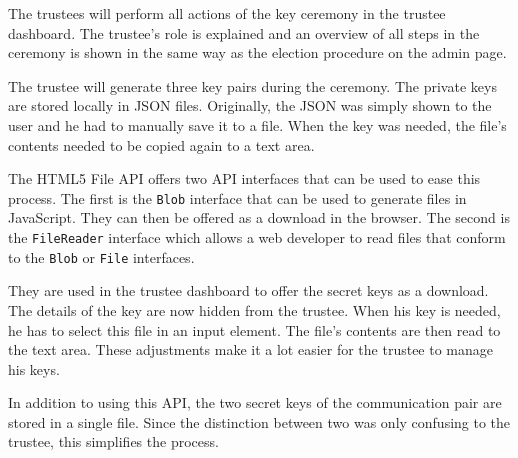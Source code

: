 The trustees will perform all actions of the key ceremony in the trustee dashboard. The trustee's role is explained and an overview of all steps in the ceremony is shown in the same way as the election procedure on the admin page.

\par The trustee will generate three key pairs during the ceremony. The private keys are stored locally in JSON files. Originally, the JSON was simply shown to the user and he had to manually save it to a file. When the key was needed, the file's contents needed to be copied again to a text area.

\par The HTML5 File API offers two API interfaces that can be used to ease this process.\cite{ranganathan_sicking_file_api} The first is the \texttt{Blob} interface that can be used to generate files in JavaScript. They can then be offered as a download in the browser. The second is the \texttt{FileReader} interface which allows a web developer to read files that conform to the \texttt{Blob} or \texttt{File} interfaces.

\par They are used in the trustee dashboard to offer the secret keys as a download. The details of the key are now hidden from the trustee. When his key is needed, he has to select this file in an input element. The file's contents are then read to the text area. These adjustments make it a lot easier for the trustee to manage his keys.

\par In addition to using this API, the two secret keys of the communication pair are stored in a single file. Since the distinction between two was only confusing to the trustee, this simplifies the process.
